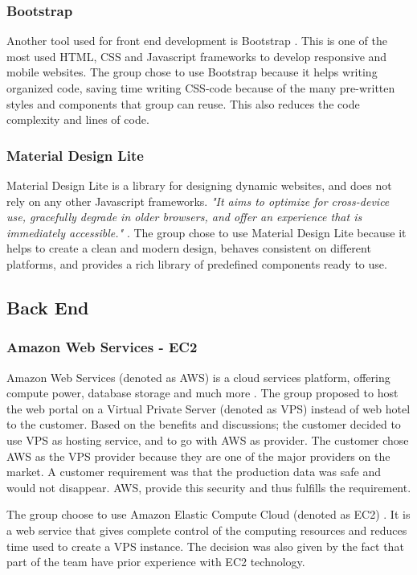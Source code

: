 \subsubsection{Bootstrap}
Another tool used for front end development is Bootstrap \cite{Bootstrap}. This is one of the most used HTML, CSS and Javascript frameworks to develop responsive and mobile websites. The group chose to use Bootstrap because it helps writing organized code, saving time writing CSS-code because of the many pre-written styles and components that group can reuse. This also reduces the code complexity and lines of code. 

\subsubsection{Material Design Lite}
\label{mdl}
Material Design Lite \cite{Material_Design_Lite} is a library for designing dynamic websites, and does not rely on any other Javascript frameworks. \textit{"It aims to optimize for cross-device use, gracefully degrade in older browsers, and offer an experience that is immediately accessible."} \cite{Material_Design_Lite}. The group chose to use Material Design Lite because it helps to create a clean and modern design, behaves consistent on different platforms, and provides a rich library of predefined components ready to use.

\subsection{Back End}
\label{backEnd}
\subsubsection{Amazon Web Services - EC2}
Amazon Web Services (denoted as AWS) is a cloud services platform, offering compute power, database storage and much more \cite{AWS}. The group proposed to host the web portal on a Virtual Private Server (denoted as VPS) instead of web hotel to the customer. Based on the benefits and discussions; the customer decided to use VPS as hosting service, and to go with AWS as provider. The customer chose AWS as the VPS provider because they are one of the major providers on the market. A customer requirement was that the production data was safe and would not disappear. AWS, provide this security and thus fulfills the requirement.

The group choose to use Amazon Elastic Compute Cloud (denoted as EC2) \cite{EC2}. It is a web service that gives complete control of the computing resources and reduces time used to create a VPS instance. The decision was also given by the fact that part of the team have prior experience with EC2 technology. 


